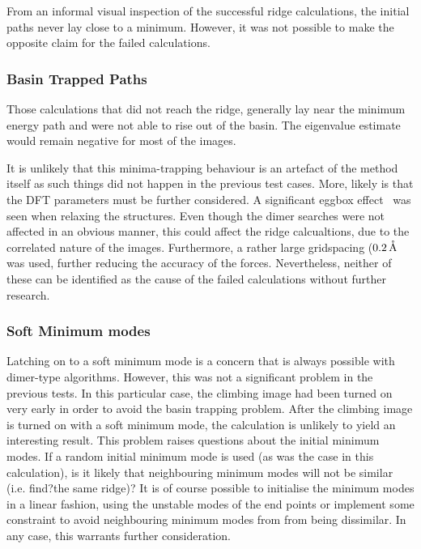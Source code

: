From an informal visual inspection of the successful ridge calculations, the initial paths never lay close to a minimum.
However, it was not possible to make the opposite claim for the failed calculations.

\subsubsection{Basin Trapped Paths}
Those calculations that did not reach the ridge, generally lay near the minimum energy path and were not able to rise out of the basin.
The eigenvalue estimate would remain negative for most of the images.

It is unlikely that this minima-trapping behaviour is an artefact of the method itself as such things did not happen in the previous test cases.
More, likely is that the DFT parameters must be further considered.
A significant eggbox effect~\cite{gpaw-2005} was seen when relaxing the structures.
Even though the dimer searches were not affected in an obvious manner, this could affect the ridge calcualtions, due to the correlated nature of the images.
Furthermore, a rather large gridspacing ($0.2 \, \mathrm{\mathring{\mathrm{A}}}$ was used, further reducing the accuracy of the forces.
Nevertheless, neither of these can be identified as the cause of the failed calculations without further research.

\subsubsection{Soft Minimum modes}
Latching on to a soft minimum mode is a concern that is always possible with dimer-type algorithms.
However, this was not a significant problem in the previous tests.
In this particular case, the climbing image had been turned on very early in order to avoid the basin trapping problem.
After the climbing image is turned on with a soft minimum mode, the calculation is unlikely to yield an interesting result.
This problem raises questions about the initial minimum modes.
If a random initial minimum mode is used (as was the case in this calculation), is it likely that neighbouring minimum modes will not be similar (i.e. find?the same ridge)?
It is of course possible to initialise the minimum modes in a linear fashion, using the unstable modes of the end points or implement some constraint to avoid neighbouring minimum modes from from being dissimilar.
In any case, this warrants further consideration.

